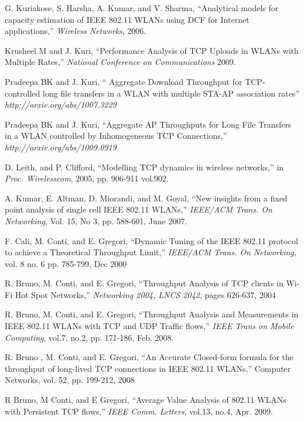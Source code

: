 \documentclass[conference]{IEEEtran}
\begin{document}
\begin{thebibliography}{}
 G. Kuriakose, S. Harsha, A. Kumar, and V. Sharma, ``Analytical models 
for capacity estimation of IEEE 802.11 WLANs using DCF for Internet 
applications,'' \emph{ Wireless Networks}, 2006.

Krusheel M and J. Kuri, ``Performance Analysis of TCP Uploads in WLANs 
with Multiple Rates,'' \emph{ National Conference on Communications } 2009.

Pradeepa BK and J. Kuri, `` Aggregate Download Throughput for TCP-controlled
long file transfers in a WLAN with multiple STA-AP association rates'' 
\emph{http://arxiv.org/abs/1007.3229}

Pradeepa BK and J. Kuri, ``Aggregate AP Throughputs for Long File 
Transfers in a WLAN controlled by Inhomogeneous TCP Connections,'' \emph{http://arxiv.org/abs/1009.0919}

D. Leith, and P. Clifford, ``Modelling TCP dynamics in wireless
networks,'' in \emph{ Proc. Wirelesscom}, 2005, pp. 906-911 vol.902. 

A. Kumar, E. Altman, D. Miorandi, and M. Goyal,  ``New insights from a 
fixed point analysis of single cell IEEE 802.11 WLANs,'' \emph{ IEEE/ACM 
Trans. On Networking}, Vol. 15, No 3, pp. 588-601, June 2007.

F. Cali, M. Conti, and E. Gregori, ``Dynamic Tuning of the IEEE 802.11
protocol to achieve a Theoretical Throughput Limit,'' \emph{IEEE/ACM 
Trans. On Networking}, vol. 8 no. 6 pp. 785-799, Dec 2000

R. Bruno, M. Conti, and E. Gregori, ``Throughput Analysis of TCP
clients in Wi-Fi Hot Spot Networks,'' \emph{Networking 2004, LNCS 2042},
pages 626-637, 2004

R. Bruno, M. Conti, and E. Gregori, ``Throughput Analysis and Measurements in IEEE
 802.11 WLANs with TCP and UDP Traffic flows,'' \emph{IEEE Trans on 
 Mobile Computing}, vol.7, no.2, pp. 171-186, Feb. 2008.

R. Bruno , M. Conti, and E. Gregori, ``An Accurate Closed-form formula
for the throughput of long-lived TCP connections in IEEE 802.11
WLANs,'' Computer Networks, vol. 52, pp. 199-212, 2008

R Bruno, M Conti, and E Gregori, ``Average Value Analysis of 802.11 WLANs with 
Persistent TCP flows,'' \emph{IEEE Comm. Letters}, vol.13, no.4, Apr. 2009.


\end{thebibliography}
\end{document}
